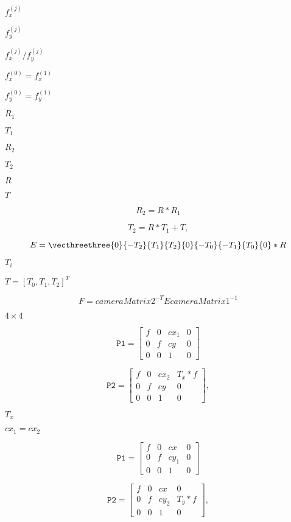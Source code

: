 \documentclass{article}
\begin{document}
$f^{(j)}_x$
\pagebreak

$f^{(j)}_y$
\pagebreak

$f^{(j)}_x/f^{(j)}_y$
\pagebreak

$f^{(0)}_x=f^{(1)}_x$
\pagebreak

$f^{(0)}_y=f^{(1)}_y$
\pagebreak

$R_1$
\pagebreak

$T_1$
\pagebreak

$R_2$
\pagebreak

$T_2$
\pagebreak

$R$
\pagebreak

$T$
\pagebreak

\[R_2=R*R_1\]
\pagebreak

\[T_2=R*T_1 + T,\]
\pagebreak

\[E= \vecthreethree{0}{-T_2}{T_1}{T_2}{0}{-T_0}{-T_1}{T_0}{0} *R\]
\pagebreak

$T_i$
\pagebreak

$T=[T_0, T_1, T_2]^T$
\pagebreak

\[F = cameraMatrix2^{-T} E cameraMatrix1^{-1}\]
\pagebreak

$4 \times 4$
\pagebreak

\[\texttt{P1} = \begin{bmatrix} f & 0 & cx_1 & 0 \\ 0 & f & cy & 0 \\ 0 & 0 & 1 & 0 \end{bmatrix}\]
\pagebreak

\[\texttt{P2} = \begin{bmatrix} f & 0 & cx_2 & T_x*f \\ 0 & f & cy & 0 \\ 0 & 0 & 1 & 0 \end{bmatrix} ,\]
\pagebreak

$T_x$
\pagebreak

$cx_1=cx_2$
\pagebreak

\[\texttt{P1} = \begin{bmatrix} f & 0 & cx & 0 \\ 0 & f & cy_1 & 0 \\ 0 & 0 & 1 & 0 \end{bmatrix}\]
\pagebreak

\[\texttt{P2} = \begin{bmatrix} f & 0 & cx & 0 \\ 0 & f & cy_2 & T_y*f \\ 0 & 0 & 1 & 0 \end{bmatrix} ,\]
\pagebreak
\end{document}
